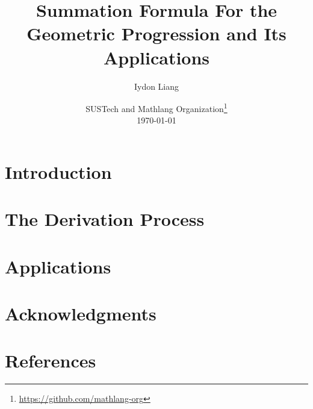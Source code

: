 \title{Summation Formula For the Geometric Progression and Its Applications}
\author{Iydon Liang}
\date{SUSTech and Mathlang Organization\footnote{\url{https://github.com/mathlang-org}}\\\today}
\maketitle

\clearpage

\setcounter{tocdepth}{2}\tableofcontents\clearpage

\section{Introduction}


\section{The Derivation Process}


\section{Applications}


\section{Acknowledgments}
\clearpage

\section{References}
\clearpage

\appendix

